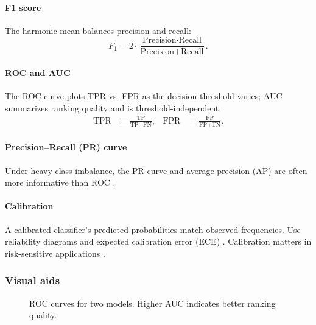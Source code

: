 \paragraph{F1 score} The harmonic mean balances precision and recall:
\begin{equation}
F_1 = 2 \cdot \frac{\text{Precision} \cdot \text{Recall}}{\text{Precision} + \text{Recall}}.
\end{equation}

\paragraph{ROC and AUC} The ROC curve  plots TPR vs. FPR as the decision threshold varies; AUC summarizes ranking quality and is threshold-independent.
\begin{align}
\text{TPR} &= \frac{\text{TP}}{\text{TP} + \text{FN}}, & \text{FPR} &= \frac{\text{FP}}{\text{FP} + \text{TN}}.
\end{align}

\paragraph{Precision--Recall (PR) curve} Under heavy class imbalance, the PR curve  and average precision (AP) are often more informative than ROC \textcite{Prince2023}.

\paragraph{Calibration} A calibrated classifier's predicted probabilities match observed frequencies. Use reliability diagrams and expected calibration error (ECE) . Calibration matters in risk-sensitive applications \textcite{GoodfellowEtAl2016}.

\subsubsection*{Visual aids}

\begin{figure}[h]
  \centering
  \caption{ROC curves for two models. Higher AUC indicates better ranking quality.}
  \label{fig:roc-curves}
\end{figure}

